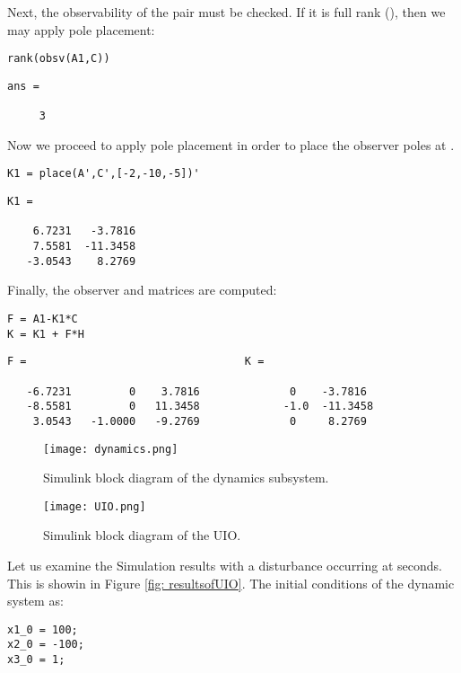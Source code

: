 \documentclass{amsart}
\theoremstyle{definition}
\theoremstyle{remark}
\numberwithin{equation}{section}
\begin{document}
\begin{par}
Next, the observability of the pair  must be checked. If it is full rank (), then we may apply pole placement:
\end{par}
\begin{verbatim}
rank(obsv(A1,C))
\end{verbatim}

        \color{lightgray} \begin{verbatim}
ans =

     3

\end{verbatim} \color{black}
    
Now we proceed to apply pole placement in order to place the observer poles at .

\begin{verbatim}
K1 = place(A',C',[-2,-10,-5])'
\end{verbatim}

        \color{lightgray} \begin{verbatim}
K1 =

    6.7231   -3.7816
    7.5581  -11.3458
   -3.0543    8.2769

\end{verbatim} \color{black}

\begin{par}
Finally, the observer  and  matrices are computed:
\end{par} 
\begin{verbatim}
F = A1-K1*C
K = K1 + F*H
\end{verbatim}
    \color{lightgray} \begin{verbatim}
F =                                  K =

   -6.7231         0    3.7816              0    -3.7816
   -8.5581         0   11.3458             -1.0  -11.3458
    3.0543   -1.0000   -9.2769              0     8.2769

\end{verbatim} \color{black}

\begin{figure}[h]
    \centering
    \texttt{[image: dynamics.png]}
    \caption{Simulink block diagram of the dynamics subsystem.}
    \label{fig:dynamics}
\end{figure}
\begin{figure}[h]
    \centering
    \texttt{[image: UIO.png]}
    \caption{Simulink block diagram of the UIO.}
    \label{fig:UIO}
\end{figure}
Let us examine the Simulation results with a disturbance occurring at  seconds. This is showin in Figure \ref{fig: resultsofUIO}. The initial conditions of the dynamic system as:
\begin{verbatim}
x1_0 = 100;
x2_0 = -100;
x3_0 = 1;
\end{verbatim}
\end{document}
